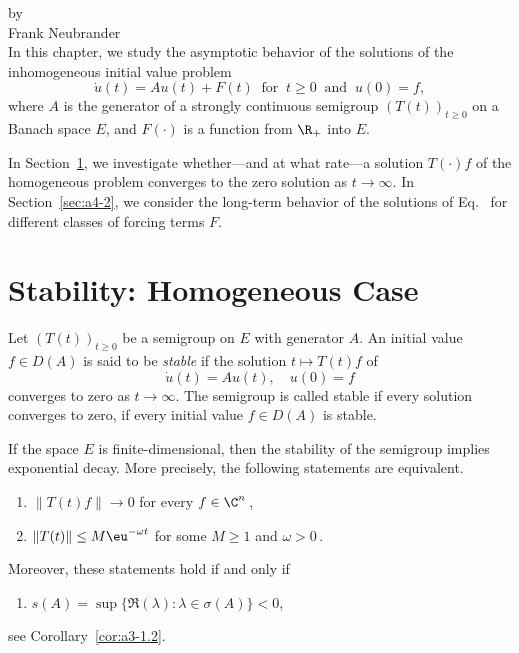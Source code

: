 \label{chap:a4}%
\thispagestyle{empty}
{\Large
\vspace*{-.75cm}
by \\[.25em]
Frank Neubrander
\vspace{.75cm}
\\
}
In this chapter, we study the asymptotic behavior of the solutions of the inhomogeneous initial value problem
\begin{equation}\label{eq:c4-1}
\dot{u}(t) = Au(t) + F(t) \ \text{ for } \  t \geq 0 \ \text{ and } \  
 u(0) = f, \tag{*}
\end{equation}
where $ A $ is the generator of a strongly continuous semigroup $ (T(t))_{t \geq 0} $ on a Banach space $ E $, and $ F(\cdot) $ is a function from $ \R_{+} $ into $ E $.

In Section~\ref{sec:a4-1}, we investigate whether---and at what rate---a solution $ T(\cdot)f $ of the homogeneous problem converges to the zero solution as $ t \to \infty $. 
In Section~\ref{sec:a4-2}, we consider the long-term behavior of the solutions of Eq.~\myeqpageref{eq:c4-1} for different classes of forcing terms $ F $.
\section{Stability: Homogeneous Case}\label{sec:a4-1}
Let $ (T(t))_{t \geq 0} $ be a semigroup on $ E $ with generator $ A $.
An initial value $ f \in D(A) $ is said to be \emph{stable} if the solution $ t \mapsto T(t)f $ of
\index{stability!stable}
\begin{equation}\label{eq:c4-2}
\dot{u}(t) = Au(t), \quad u(0) = f \tag{ACP}
\end{equation}
converges to zero as $ t \to \infty $. 
The semigroup is called stable if every solution converges to zero, \ie if every initial value $ f \in D(A) $ is stable.

If the space $ E $ is finite-dimensional, then the stability of the semigroup implies exponential decay. 
More precisely, the following statements are equivalent.
\begin{enumerate}[\upshape (a)]
\item 
$ \|T(t)f\| \to 0 $ for every $ f \in \C^{n} $\,,

\item 
$ \|T(t)\| \leq M \eu^{-\omega t} $ for some $M \geq 1$ and  $\omega > 0 $\,.
\end{enumerate}
Moreover, these statements hold if and only if
\begin{enumerate}
\item 
$s(A) = \sup\{\Re(\lambda) \colon \lambda \in \sigma(A)\} < 0$, 
\end{enumerate}
see Corollary~\ref{cor:a3-1.2}.

